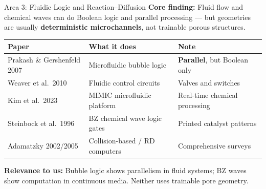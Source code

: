 \documentclass[aspectratio=169,11pt]{beamer}
\begin{document}
\begin{frame}{Area 3: Fluidic Logic and Reaction--Diffusion}
  \textbf{Core finding:} Fluid flow and chemical waves can do Boolean logic and parallel processing --- but geometries are usually \textbf{deterministic microchannels}, not trainable porous structures.

  \vspace{0.15cm}
  \begin{table}
    \centering
    \footnotesize
    \renewcommand{\arraystretch}{1.05}
    \begin{tabular}{@{}>{\raggedright}p{3.2cm}>{\raggedright}p{5.2cm}>{\raggedright\arraybackslash}p{3.5cm}@{}}
      \toprule
      \textbf{Paper} & \textbf{What it does} & \textbf{Note} \\
      \midrule
      Prakash \& Gershenfeld 2007 & Microfluidic bubble logic & \textbf{Parallel}, but Boolean only \\
      Weaver et al.\ 2010 & Fluidic control circuits & Valves and switches \\
      Kim et al.\ 2023 & MIMIC microfluidic platform & Real-time chemical processing \\
      Steinbock et al.\ 1996 & BZ chemical wave logic gates & Printed catalyst patterns \\
      Adamatzky 2002/2005 & Collision-based / RD computers & Comprehensive surveys \\
      \bottomrule
    \end{tabular}
  \end{table}

  \vspace{0.1cm}
  {\small \textbf{Relevance to us:} Bubble logic shows parallelism in fluid systems; BZ waves show computation in continuous media. Neither uses trainable pore geometry.}
\end{frame}
\end{document}

